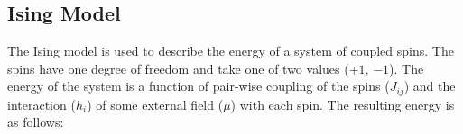     

\subsection{Ising Model}\label{sec:ising_mode}

The Ising model is used to describe the energy of a system of coupled
spins. The spins have one degree of freedom and take one of two values ($+1$,
$-1$). The energy of the system is a function of pair-wise coupling of the
spins ($J_{ij}$) and the interaction ($h_i$)
of some external field ($\mu$) with each
spin. The resulting energy is as follows:

